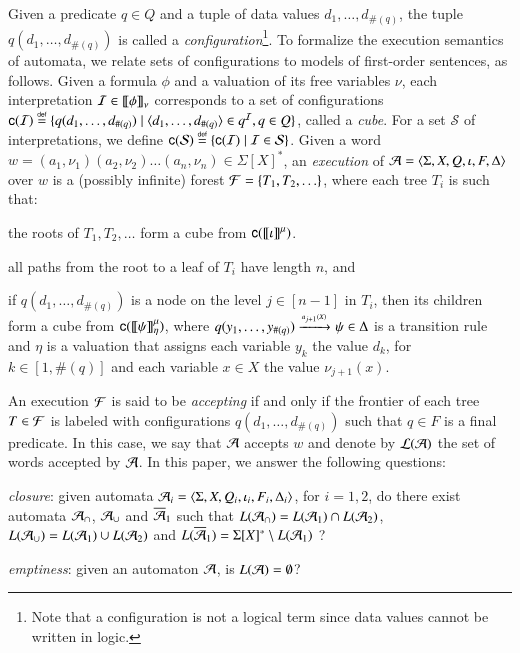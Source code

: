 \documentclass{llncs}
\begin{document}
Given a predicate $q \in Q$ and a tuple of data values
$d_1,\ldots,d_{\#(q)}$, the tuple $q(d_1,\ldots,d_{\#(q)})$ is called
a \emph{configuration}\footnote{Note that a configuration is not a
  logical term since data values cannot be written in logic.}. To
formalize the execution semantics of automata, we relate sets of
configurations to models of first-order sentences, as follows. Given a
formula $\phi$ and a valuation of its free variables $\nu$, each
interpretation $\mathcal{I} \in {\bf [\![} \phi {\bf ]\!]}_\nu$ corresponds to a set of
configurations $\mathsf{c}({\mathcal{I}}) \stackrel{\scriptscriptstyle{\mathsf{def}}}{=} \{ q(d_1,\ldots,d_{\#(q)}) \mid
  \langle d_1,\ldots,d_{\#(q)} \rangle \in q^{\mathcal{I}}, q \in Q \}$, called a
\emph{cube}. For a set $\mathcal{S}$ of interpretations, we define
$\mathsf{c}({\mathcal{S}}) \stackrel{\scriptscriptstyle{\mathsf{def}}}{=} \{ \mathsf{c}({\mathcal{I}}) \mid \mathcal{I} \in
  \mathcal{S} \}$. Given a word $w=(a_1,\nu_1)(a_2,\nu_2) \ldots
(a_n,\nu_n) \in \Sigma[X]^*$, an \emph{execution} of
$\mathcal{A}=\langle \Sigma,X,Q,\iota,F,\Delta \rangle$ over $w$ is a (possibly
infinite) forest $\mathcal{F} = \{ T_1,T_2,\ldots \}$, where each tree $T_i$ is
such that:
\begin{compactitem}
\item the roots of $T_1, T_2, \ldots$ form a cube from
  $\mathsf{c}({{\bf [\![} \iota {\bf ]\!]}^\mu})$. %
%
\item all paths from the root to a leaf of $T_i$ have length $n$, and
%
\item if $q(d_1,\ldots,d_{\#(q)})$ is a node on the level $j \in
  [n-1]$ in $T_i$, then its children form a cube from
  $\mathsf{c}({{\bf [\![} \psi {\bf ]\!]}^\mu_\eta})$, where \(q(y_1,\ldots,y_{\#(q)})
  \xrightarrow{{\scriptscriptstyle a_{j+1}(X)}}_{{\scriptstyle }} \psi \in \Delta\) is a transition rule and
  $\eta$ is a valuation that assigns each variable $y_k$ the value
  $d_k$, for $k \in [1,\#(q)]$ and each variable $x \in X$ the value
  $\nu_{j+1}(x)$. %
\end{compactitem}
An execution $\mathcal{F}$ is said to be \emph{accepting} if and only if the
frontier of each tree $T \in \mathcal{F}$ is labeled with configurations
$q(d_1,\ldots,d_{\#(q)})$ such that $q \in F$ is a final predicate. In
this case, we say that $\mathcal{A}$ accepts $w$ and denote by ${\mathcal L}({\mathcal{A}})$ the
set of words accepted by $\mathcal{A}$. In this paper, we answer the following
questions: \begin{compactenum}
\item \emph{closure}: given automata $\mathcal{A}_i =
  \langle \Sigma,X,Q_i,\iota_i,F_i,\Delta_i \rangle$, for $i=1,2$, do there
  exist automata $\mathcal{A}_\cap$, $\mathcal{A}_\cup$ and $\overline{\mathcal{A}}_1$ such that
  $L(\mathcal{A}_\cap) = L(\mathcal{A}_1) \cap L(\mathcal{A}_2)$, $L(\mathcal{A}_\cup) = L(\mathcal{A}_1) \cup
  L(\mathcal{A}_2)$ and $L(\overline{\mathcal{A}}_1) = \Sigma[X]^* \setminus L(\mathcal{A}_1)$ ?
%
\item \emph{emptiness}: given an automaton $\mathcal{A}$, is $L(\mathcal{A}) =
  \emptyset$?
\end{compactenum}
\end{document}
